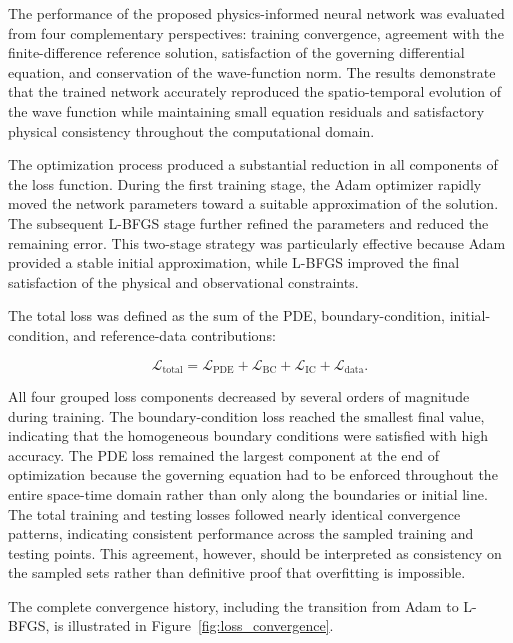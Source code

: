 \documentclass[11pt]{article}
\begin{document}
The performance of the proposed physics-informed neural network was evaluated from four complementary perspectives: training 
convergence, agreement with the finite-difference reference solution, satisfaction of the governing 
differential equation, and conservation of the wave-function norm. The results demonstrate that the 
trained network accurately reproduced the spatio-temporal evolution of the wave function while 
maintaining small equation residuals and satisfactory physical consistency throughout the 
computational domain.

The optimization process produced a substantial reduction in all components of the loss 
function. During the first training stage, the Adam optimizer rapidly moved the network 
parameters toward a suitable approximation of the solution. The subsequent L-BFGS stage 
further refined the parameters and reduced the remaining error. This two-stage strategy 
was particularly effective because Adam provided a stable initial approximation, while 
L-BFGS improved the final satisfaction of the physical and observational constraints.

The total loss was defined as the sum of the PDE, boundary-condition, initial-condition, and 
reference-data contributions:

\begin{equation}
	\mathcal{L}_{\mathrm{total}}
	=
	\mathcal{L}_{\mathrm{PDE}}
	+
	\mathcal{L}_{\mathrm{BC}}
	+
	\mathcal{L}_{\mathrm{IC}}
	+
	\mathcal{L}_{\mathrm{data}}.
\end{equation}

All four grouped loss components decreased by several orders of magnitude during training. The boundary-condition loss reached the smallest final value, indicating that the homogeneous boundary conditions were satisfied with high accuracy. The PDE loss remained the largest component at the end of optimization because the governing equation had to be enforced throughout the entire space-time domain rather than only along the boundaries or initial line. The total training and testing losses followed nearly identical convergence patterns, indicating consistent performance across the sampled training and testing points. This agreement, however, should be interpreted as consistency on the sampled sets rather than definitive proof that overfitting is impossible.

The complete convergence history, including the transition from Adam to L-BFGS, is illustrated in Figure~\ref{fig:loss_convergence}.
\end{document}
